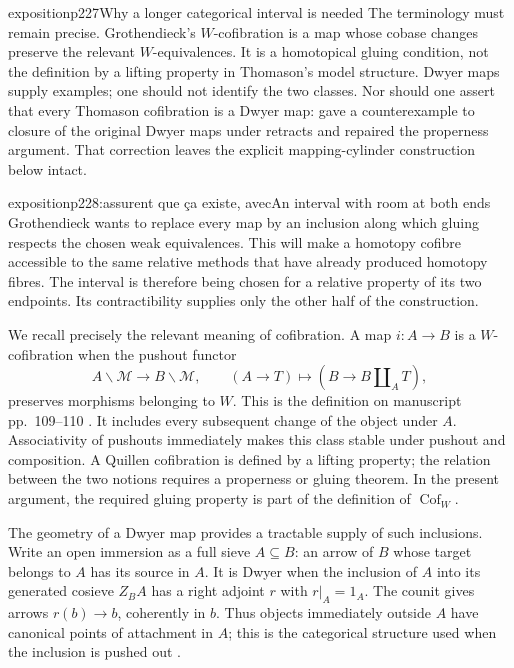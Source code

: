 \begin{dcomment}{exposition}{p227}{Why a longer categorical interval is needed}
The terminology must remain precise. Grothendieck's $W$-cofibration is a map whose cobase changes preserve the relevant $W$-equivalences. It is a homotopical gluing condition, not the definition by a lifting property in Thomason's model structure. Dwyer maps supply examples; one should not identify the two classes. Nor should one assert that every Thomason cofibration is a Dwyer map: \citet[pp.~227--231]{Cisinski1999Dwyer} gave a counterexample to closure of the original Dwyer maps under retracts and repaired the properness argument. That correction leaves the explicit mapping-cylinder construction below intact.
\end{dcomment}

\begin{dcomment}{exposition}{p228:assurent que ça existe, avec}{An interval with room at both ends}
Grothendieck wants to replace every map by an inclusion along which gluing respects the chosen weak equivalences. This will make a homotopy cofibre accessible to the same relative methods that have already produced homotopy fibres. The interval is therefore being chosen for a relative property of its two endpoints. Its contractibility supplies only the other half of the construction.

We recall precisely the relevant meaning of cofibration. A map $i:A\to B$ is a $W$-cofibration when the pushout functor
\[
 A\backslash\mathcal M\longrightarrow B\backslash\mathcal M,
 \qquad (A\to T)\longmapsto(B\to B\amalg_A T),
\]
preserves morphisms belonging to $W$. This is the definition on manuscript pp.~109--110 \citep[Definition~2(c)]{Grothendieck1990XII}. It includes every subsequent change of the object under $A$. Associativity of pushouts immediately makes this class stable under pushout and composition. A Quillen cofibration is defined by a lifting property; the relation between the two notions requires a properness or gluing theorem. In the present argument, the required gluing property is part of the definition of $\operatorname{Cof}_W$.

The geometry of a Dwyer map provides a tractable supply of such inclusions. Write an open immersion as a full sieve $A\subseteq B$: an arrow of $B$ whose target belongs to $A$ has its source in $A$. It is Dwyer when the inclusion of $A$ into its generated cosieve $Z_BA$ has a right adjoint $r$ with $r|_A=1_A$. The counit gives arrows $r(b)\to b$, coherently in $b$. Thus objects immediately outside $A$ have canonical points of attachment in $A$; this is the categorical structure used when the inclusion is pushed out \citep[Definition~4.1]{Thomason1980}.


\end{dcomment}
